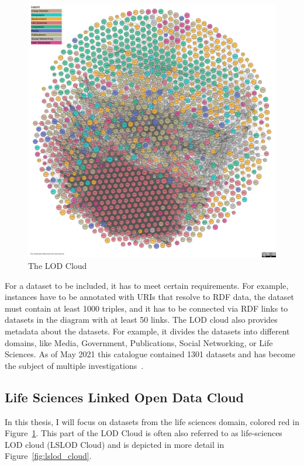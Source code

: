 \documentclass[runningheads]{llncs}
\begin{document}
    \begin{figure}[ht]
        \centering
        \includegraphics[width=\textwidth]{figures/lod-cloud-sm}
        \caption{The LOD Cloud\protect\footnotemark[\value{footnote}]}
        \label{fig:lod_cloud}
    \end{figure}

    For a dataset to be included, it has to meet certain requirements.
    For example, instances have to be annotated with URIs that resolve to RDF data, the dataset must contain at least 1000 triples, and it has to be connected via RDF links to datasets in the diagram with at least 50 links.
    The LOD cloud also provides metadata about the datasets.
    For example, it divides the datasets into different domains, like Media, Government, Publications, Social Networking, or Life Sciences.
    As of May 2021 this catalogue contained 1301 datasets and has become the subject of multiple investigations~\citep{debattista2019lod, kamdar2019enabling, schmachtenberg2014adoption}.

    \subsection{Life Sciences Linked Open Data Cloud}
    In this thesis, I will focus on datasets from the life sciences domain, colored red in Figure~\ref{fig:lod_cloud}.
    This part of the LOD Cloud is often also referred to as life-sciences LOD cloud (LSLOD Cloud) and is depicted in more detail in Figure~\ref{fig:lslod_cloud}.
\end{document}
